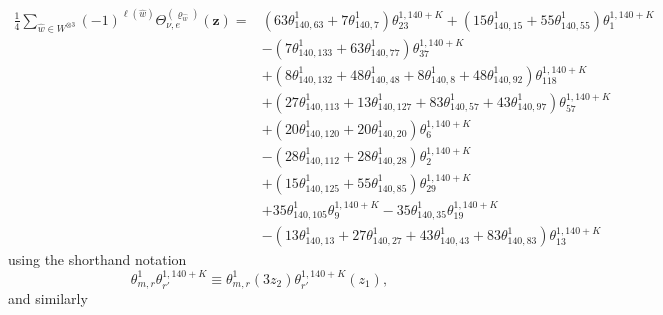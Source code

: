 \documentclass[pdftex]{sigma}
\theoremstyle{definition}
\numberwithin{equation}{section}
\begin{document}
\begin{align}
\frac{1}{4}\sum_{\hat{w}\in W^{\otimes 3}}(-1)^{\ell(\hat{w})}\Theta^{(\varrho_{\hat{w}})}_{\nu,e}\left(\mathbf{z}\right)={}& {\left(63 \theta^{1}_{140,63} + 7 \theta^{1}_{140,7}\right)} \theta^{1,140+K}_{23}
+ {\left(15 \theta^{1}_{140,15} + 55 \theta^{1}_{140,55}\right)} \theta^{1,140+K}_{1} \nonumber\\
		&
- {\left( 7 \theta^{1}_{140,133} + 63 \theta^{1}_{140,77}\right)} \theta^{1,140+K}_{37}\nonumber\\
		&
	+ \left(8\theta^{1}_{140,132} + 48 \theta^{1}_{140,48} + 8\theta^{1}_{140,8} + 48 \theta^{1}_{140,92} \right) \theta^{1,140+K}_{118} \nonumber\\
	 &
+ \left(27 \theta^{1}_{140,113} + 13 \theta^{1}_{140,127} + 83 \theta^{1}_{140,57} + 43 \theta^{1}_{140,97} \right) \theta^{1,140+K}_{57}\nonumber\\
	&
+ {\left( 20 \theta^{1}_{140,120} + 20 \theta^{1}_{140,20}\right)} \theta^{1,140+K}_{6} \nonumber\\
	&
- \left( 28 \theta^{1}_{140,112} + 28 \theta^{1}_{140,28}\right) \theta^{1,140+K}_{2}\nonumber\\
	&
+ {\left(15 \theta^{1}_{140,125} + 55 \theta^{1}_{140,85}\right)} \theta^{1,140+K}_{29} \nonumber\\
	&
+ 35 \theta^{1}_{140,105} \theta^{1,140+K}_{9} - 35 \theta^{1}_{140,35} \theta^{1,140+K}_{19}\nonumber\\
	&
- \left(13 \theta^{1}_{140,13} + 27 \theta^{1}_{140,27} + 43 \theta^{1}_{140,43} + 83 \theta^{1}_{140,83}\right) \theta^{1,140+K}_{13}\!\!\!\label{eq:theta0_example1}
\end{align}
using the shorthand notation
\[
 \theta^{1}_{m,r} \theta^{1,140+K}_{r'}
\equiv
 \theta^{1}_{m,r} \left(3z_{2} \right)\theta^{1,140+K}_{r'}\left(z_{1} \right),
\]
and similarly
\end{document}
